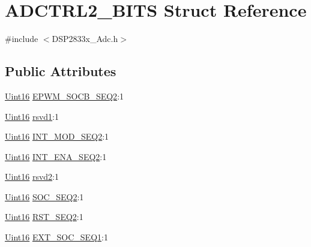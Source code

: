 \hypertarget{struct_a_d_c_t_r_l2___b_i_t_s}{}\section{A\+D\+C\+T\+R\+L2\+\_\+\+B\+I\+T\+S Struct Reference}
\label{struct_a_d_c_t_r_l2___b_i_t_s}


{\ttfamily \#include $<$D\+S\+P2833x\+\_\+\+Adc.\+h$>$}

\subsection*{Public Attributes}
\begin{DoxyCompactItemize}
\item 
\hyperlink{_d_s_p2833x___device_8h_a59a9f6be4562c327cbfb4f7e8e18f08b}{Uint16} \hyperlink{struct_a_d_c_t_r_l2___b_i_t_s_a9a95c2e41376be98a9b65200058f7f94}{E\+P\+W\+M\+\_\+\+S\+O\+C\+B\+\_\+\+S\+E\+Q2}\+:1
\item 
\hyperlink{_d_s_p2833x___device_8h_a59a9f6be4562c327cbfb4f7e8e18f08b}{Uint16} \hyperlink{struct_a_d_c_t_r_l2___b_i_t_s_ac9cfaf3dcbe846a5415d2fb6b01f19d9}{rsvd1}\+:1
\item 
\hyperlink{_d_s_p2833x___device_8h_a59a9f6be4562c327cbfb4f7e8e18f08b}{Uint16} \hyperlink{struct_a_d_c_t_r_l2___b_i_t_s_a9b380c1946f0a642f42f1e11c3ffaee7}{I\+N\+T\+\_\+\+M\+O\+D\+\_\+\+S\+E\+Q2}\+:1
\item 
\hyperlink{_d_s_p2833x___device_8h_a59a9f6be4562c327cbfb4f7e8e18f08b}{Uint16} \hyperlink{struct_a_d_c_t_r_l2___b_i_t_s_aa3dd1f4d403bf1639cb1aaac79ff055c}{I\+N\+T\+\_\+\+E\+N\+A\+\_\+\+S\+E\+Q2}\+:1
\item 
\hyperlink{_d_s_p2833x___device_8h_a59a9f6be4562c327cbfb4f7e8e18f08b}{Uint16} \hyperlink{struct_a_d_c_t_r_l2___b_i_t_s_a503b1d82bbc1417ef8658d1a658e467f}{rsvd2}\+:1
\item 
\hyperlink{_d_s_p2833x___device_8h_a59a9f6be4562c327cbfb4f7e8e18f08b}{Uint16} \hyperlink{struct_a_d_c_t_r_l2___b_i_t_s_a416e21b23c8c4104de5cc399b0cd1b36}{S\+O\+C\+\_\+\+S\+E\+Q2}\+:1
\item 
\hyperlink{_d_s_p2833x___device_8h_a59a9f6be4562c327cbfb4f7e8e18f08b}{Uint16} \hyperlink{struct_a_d_c_t_r_l2___b_i_t_s_acd88121787538ceb9b56dafbe0125ea0}{R\+S\+T\+\_\+\+S\+E\+Q2}\+:1
\item 
\hyperlink{_d_s_p2833x___device_8h_a59a9f6be4562c327cbfb4f7e8e18f08b}{Uint16} \hyperlink{struct_a_d_c_t_r_l2___b_i_t_s_a88da071f26ff155b590202d9263fc76c}{E\+X\+T\+\_\+\+S\+O\+C\+\_\+\+S\+E\+Q1}\+:1

\end{DoxyCompactItemize}
